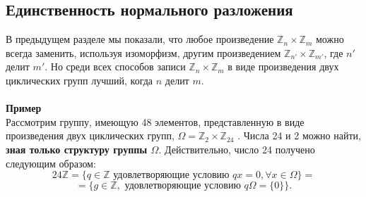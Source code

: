 \documentclass{mai_book}
\begin{document}
\subsection{Единственность нормального разложения}
\noindent В предыдущем разделе мы показали, что любое произведение $\mathbb{Z}_n \times \mathbb{Z}_m$ \linebreak можно всегда заменить, используя изоморфизм, другим произведением \linebreak $\mathbb{Z}_{n'} \times \mathbb{Z}_{m'}$, где $n'$ делит $m'$. Но среди всех способов записи $\mathbb{Z}_n \times \mathbb{Z}_m$ в \linebreak виде произведения двух циклических групп лучший, когда $n$ делит $m$. 
\\
\\
\textbf{Пример}
\\

Рассмотрим группу, имеющую 48 элементов, представленную в виде \linebreak произведения двух циклических групп, $\Omega = \mathbb{Z}_{2} \times \mathbb{Z}_{24}$ . Числа 24 и 2 можно \linebreak найти, \textbf{зная только структуру группы $\Omega$}. Действительно, число 24 \linebreak получено следующим образом:   
 $$24\mathbb{Z} = \{ q \in \mathbb{Z} \text{ удовлетворяющие условию } qx = 0 , \forall x \in \Omega\} =$$ $$
= \{g \in \mathbb{Z},\text{ удовлетворяющие условию } q\Omega = \{0\}\}.$$
\end{document}
